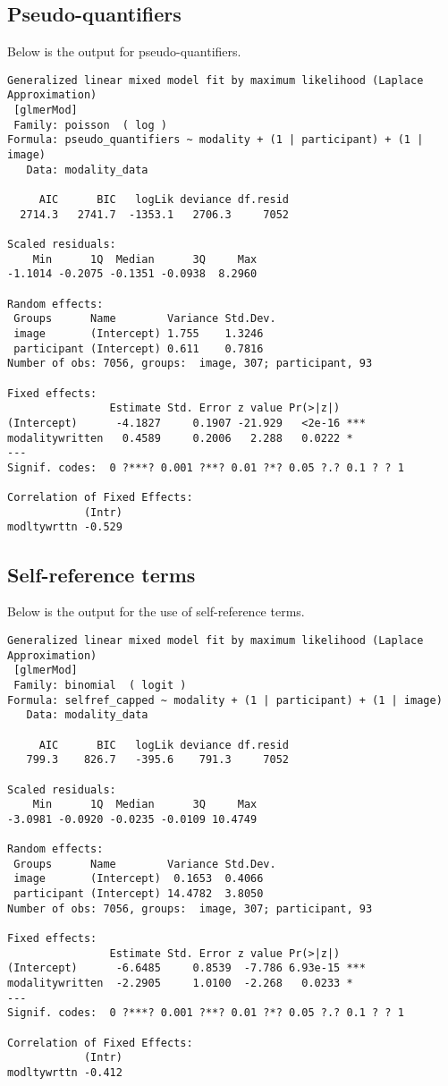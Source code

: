 \documentclass[11pt]{article}
\begin{document}
\subsection{Pseudo-quantifiers}
Below is the output for pseudo-quantifiers.
\begin{verbatim}
Generalized linear mixed model fit by maximum likelihood (Laplace  Approximation)
 [glmerMod]
 Family: poisson  ( log )
Formula: pseudo_quantifiers ~ modality + (1 | participant) + (1 | image)
   Data: modality_data

     AIC      BIC   logLik deviance df.resid 
  2714.3   2741.7  -1353.1   2706.3     7052 

Scaled residuals: 
    Min      1Q  Median      3Q     Max 
-1.1014 -0.2075 -0.1351 -0.0938  8.2960 

Random effects:
 Groups      Name        Variance Std.Dev.
 image       (Intercept) 1.755    1.3246  
 participant (Intercept) 0.611    0.7816  
Number of obs: 7056, groups:  image, 307; participant, 93

Fixed effects:
                Estimate Std. Error z value Pr(>|z|)    
(Intercept)      -4.1827     0.1907 -21.929   <2e-16 ***
modalitywritten   0.4589     0.2006   2.288   0.0222 *  
---
Signif. codes:  0 ?***? 0.001 ?**? 0.01 ?*? 0.05 ?.? 0.1 ? ? 1

Correlation of Fixed Effects:
            (Intr)
modltywrttn -0.529
\end{verbatim}

\subsection{Self-reference terms}
Below is the output for the use of self-reference terms.
\begin{verbatim}
Generalized linear mixed model fit by maximum likelihood (Laplace  Approximation)
 [glmerMod]
 Family: binomial  ( logit )
Formula: selfref_capped ~ modality + (1 | participant) + (1 | image)
   Data: modality_data

     AIC      BIC   logLik deviance df.resid 
   799.3    826.7   -395.6    791.3     7052 

Scaled residuals: 
    Min      1Q  Median      3Q     Max 
-3.0981 -0.0920 -0.0235 -0.0109 10.4749 

Random effects:
 Groups      Name        Variance Std.Dev.
 image       (Intercept)  0.1653  0.4066  
 participant (Intercept) 14.4782  3.8050  
Number of obs: 7056, groups:  image, 307; participant, 93

Fixed effects:
                Estimate Std. Error z value Pr(>|z|)    
(Intercept)      -6.6485     0.8539  -7.786 6.93e-15 ***
modalitywritten  -2.2905     1.0100  -2.268   0.0233 *  
---
Signif. codes:  0 ?***? 0.001 ?**? 0.01 ?*? 0.05 ?.? 0.1 ? ? 1

Correlation of Fixed Effects:
            (Intr)
modltywrttn -0.412
\end{verbatim}
\end{document}
